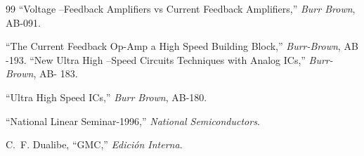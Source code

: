 \begin{thebibliography}{99}
``Voltage –Feedback Amplifiers vs Current Feedback Amplifiers,''
\emph{Burr Brown},
AB-091.

``The Current Feedback Op-Amp a High Speed Building Block,''
\emph{Burr-Brown},
AB -193.
``New Ultra High –Speed Circuits Techniques with Analog ICs,''
\emph{Burr-Brown},
AB- 183.

``Ultra High Speed ICs,''
\emph{Burr Brown},
AB-180.

``National Linear Seminar-1996,''
\emph{National Semiconductors}.

C.~F. Dualibe,
``GMC,''
\emph{Edición Interna}.
\end{thebibliography}